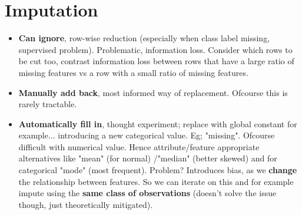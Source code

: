 \documentclass{article}
\begin{document}
\section{Imputation}
\begin{itemize}
	\item {\bf Can ignore}, row-wise reduction (especially when class label missing, supervised problem). Problematic, information loss. Consider which rows to be cut too, contrast information loss between rows that have a large ratio of missing features vs a row with a small ratio of missing features.
	\item {\bf Manually add back}, most informed way of replacement. Ofcourse this is rarely tractable.
	\item {\bf Automatically fill in}, thought experiment; replace with global constant for example... introducing a new categorical value. Eg; "missing". Ofcourse difficult with numerical value. Hence attribute/feature appropriate alternatives like "mean" (for normal) /"median" (better skewed) and for categorical "mode" (most frequent). Problem? Introduces bias, as we {\bf change} the relationship between features. So we can iterate on this and for example impute using the {\bf same class of observations} (doesn't solve the issue though, just theoretically mitigated).

\end{itemize}
\end{document}
